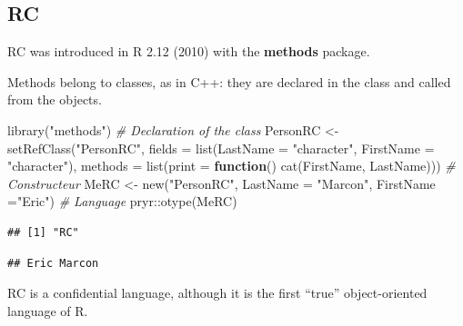 \documentclass[
  12pt,
  american,
  a4paper,
  extrafontsizes,onecolumn,openright
  ]{memoir}
\newenvironment{Shaded}{\begin{snugshade}}{\end{snugshade}}
\newcommand{\AttributeTok}[1]{\textcolor[rgb]{0.77,0.63,0.00}{#1}}
\newcommand{\CommentTok}[1]{\textcolor[rgb]{0.56,0.35,0.01}{\textit{#1}}}
\newcommand{\ControlFlowTok}[1]{\textcolor[rgb]{0.13,0.29,0.53}{\textbf{#1}}}
\newcommand{\FunctionTok}[1]{\textcolor[rgb]{0.00,0.00,0.00}{#1}}
\newcommand{\NormalTok}[1]{#1}
\newcommand{\OtherTok}[1]{\textcolor[rgb]{0.56,0.35,0.01}{#1}}
\newcommand{\SpecialCharTok}[1]{\textcolor[rgb]{0.00,0.00,0.00}{#1}}
\newcommand{\StringTok}[1]{\textcolor[rgb]{0.31,0.60,0.02}{#1}}
\begin{document}
\hypertarget{rc}{%
\subsection{RC}\label{rc}}

RC was introduced in R 2.12 (2010) with the \textbf{methods} package.

Methods belong to classes, as in C++: they are declared in the class and called from the objects.

\scriptsize

\begin{Shaded}
\begin{Highlighting}[]
\FunctionTok{library}\NormalTok{(}\StringTok{"methods"}\NormalTok{)}
\CommentTok{\# Declaration of the class}
\NormalTok{PersonRC }\OtherTok{\textless{}{-}} \FunctionTok{setRefClass}\NormalTok{(}\StringTok{"PersonRC"}\NormalTok{, }
    \AttributeTok{fields =} \FunctionTok{list}\NormalTok{(}\AttributeTok{LastName =} \StringTok{"character"}\NormalTok{, }\AttributeTok{FirstName =} \StringTok{"character"}\NormalTok{),}
    \AttributeTok{methods =} \FunctionTok{list}\NormalTok{(}\AttributeTok{print =} \ControlFlowTok{function}\NormalTok{() }\FunctionTok{cat}\NormalTok{(FirstName, LastName)))}
\CommentTok{\# Constructeur}
\NormalTok{MeRC }\OtherTok{\textless{}{-}} \FunctionTok{new}\NormalTok{(}\StringTok{"PersonRC"}\NormalTok{, }\AttributeTok{LastName =} \StringTok{"Marcon"}\NormalTok{, }\AttributeTok{FirstName =}\StringTok{"Eric"}\NormalTok{)}
\CommentTok{\# Language}
\NormalTok{pryr}\SpecialCharTok{::}\FunctionTok{otype}\NormalTok{(MeRC)}
\end{Highlighting}
\end{Shaded}

\begin{verbatim}
## [1] "RC"
\end{verbatim}

\begin{Shaded}
\end{Shaded}

\begin{verbatim}
## Eric Marcon
\end{verbatim}

\normalsize

RC is a confidential language, although it is the first \enquote{true} object-oriented language of R.
\end{document}
